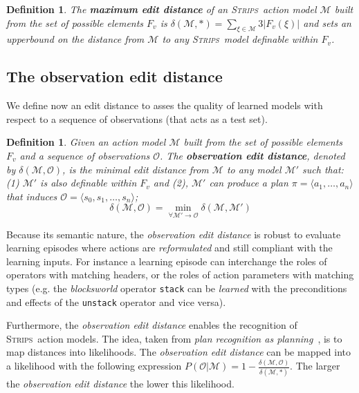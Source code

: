 \documentclass{article}
\newcommand{\tup}[1]{{\langle #1 \rangle}}
\newcommand{\strips}{\textsc{Strips}}     %
\newtheorem{definition}[theorem]{Definition}
\begin{document}
\begin{definition}
The \textbf{maximum edit distance} of an \strips\ action model $\mathcal{M}$ built from the set of possible elements $F_v$ is $\delta(\mathcal{M},*)=\sum_{\xi\in\mathcal{M}} 3|F_v(\xi)|$ and sets an upperbound on the distance from $\mathcal{M}$ to any \strips\ model definable within $F_v$.
\end{definition}

\subsection{The observation edit distance}
We define now an edit distance to asses the quality of learned models with respect to a sequence of observations (that acts as a test set).

\begin{definition}
Given an action model $\mathcal{M}$ built from the set of possible elements $F_v$ and a sequence of observations $\mathcal{O}$. The {\bf observation edit distance}, denoted by  $\delta(\mathcal{M},\mathcal{O})$, is the minimal edit distance from $\mathcal{M}$ to any model $\mathcal{M}'$ such that: (1) $\mathcal{M}'$ is also definable within $F_v$ and (2), $\mathcal{M}'$ can produce a plan $\pi=\tup{a_1, \ldots, a_n}$ that induces $\mathcal{O}=\tup{s_0, s_1, \ldots, s_n}$; \[\delta(\mathcal{M},\mathcal{O})=\min_{\forall \mathcal{M}' \rightarrow \mathcal{O}} \delta(\mathcal{M},\mathcal{M}')\]
\end{definition}

Because its semantic nature, the {\em observation edit distance} is robust to evaluate learning episodes where actions are {\em reformulated} and still compliant with the learning inputs. For instance a learning episode can interchange the roles of operators with matching headers, or the roles of action parameters with matching types (e.g. the {\em blocksworld} operator {\small\tt stack} can be {\em learned} with the preconditions and effects of the {\small\tt unstack} operator and vice versa).

Furthermore, the {\em observation edit distance} enables the recognition of \strips\ action models. The idea, taken from {\em plan recognition as planning}~\cite{ramirez2009plan}, is to map distances into likelihoods. The {\em observation edit distance} can be mapped into a likelihood with the following expression $P(\mathcal{O}|\mathcal{M})=1-\frac{\delta(\mathcal{M},\mathcal{O})}{\delta(\mathcal{M},*)}$. The larger the {\em observation edit distance} the lower this likelihood.
\end{document}
